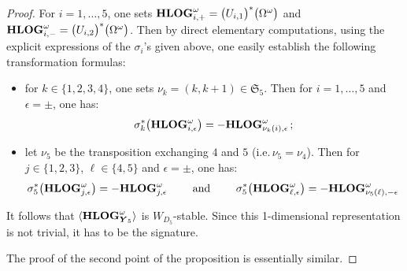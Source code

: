 \documentclass[11pt]{amsart}
\begin{document}
\begin{proof}%
For $i=1,\ldots,5$, one 
sets $ {\bf HLOG}_{i,+}^{\omega}=
\big({U_{i,1}}\big)^*\big( \Omega^\omega
\big)$  and $
{\bf HLOG}_{i,-}^{\omega}=
\big({U_{i,2}}\big)^*\big( \Omega^\omega
\big)
$. 
Then by direct elementary computations, using the explicit expressions of the $\sigma_i$'s given above, 
one easily establish the following transformation formulas: 
\begin{itemize}
\item for $k\in \{1,2,3,4\}$, one sets $\nu_k=(k,k+1)\in \mathfrak S_5$. Then 
for $ i=1,\ldots,5$  and 
$\epsilon=\pm$, 
one has: 
\begin{equation}
\label{Eq:Transfoformulas_1}
\sigma_k^*\big( {\bf HLOG}_{i,\epsilon}^{\omega} \big) =- 
{\bf HLOG}_{\nu_k(i),\epsilon}^{\omega} \, ; 
\end{equation}
\item let $\nu_5$ be the transposition exchanging $4$ and $5$ (i.e.\,$\nu_5=\nu_4$). Then 
for $j\in \{1,2,3\}$, $\ell\in \{4,5\}$ and $\epsilon=\pm$, 
one has:
\begin{equation}
\label{Eq:Transfoformulas_2}
\sigma_5^*\big( {\bf HLOG}_{j,\epsilon}^{\omega} \big)=-
{\bf HLOG}_{j,\epsilon}^{\omega} 
\qquad \mbox{ and } \qquad 
\sigma_5^*\big( {\bf HLOG}_{\ell,\epsilon}^{\omega} \big)=-
{\bf HLOG}_{\nu_5(\ell),-\epsilon}^{\omega} \, 
\end{equation}
\end{itemize}
It follows that $\langle {\bf HLOG}_{\boldsymbol{Y}_5}^{\omega}\rangle$ is $W_{D_5}$-stable. Since this 1-dimensional representation is not trivial, it has to be the signature. 

The proof of the second point of the proposition 
is essentially similar. 
\end{proof}%
\end{document}

